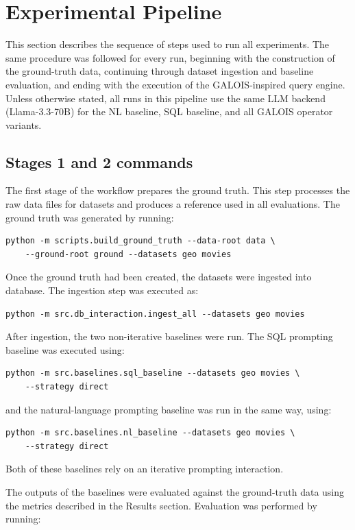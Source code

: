 \documentclass[11pt]{article}
\begin{document}
\clearpage
\section{Experimental Pipeline}
This section describes the sequence of steps used to run all experiments. The same procedure was followed for every run, beginning with the construction of the ground-truth data, continuing through dataset ingestion and baseline evaluation, and ending with the execution of the GALOIS-inspired query engine.
Unless otherwise stated, all runs in this pipeline use the same LLM backend (Llama-3.3-70B) for the NL baseline, SQL baseline, and all GALOIS operator variants.
\subsection{Stages 1 and 2 commands}
The first stage of the workflow prepares the ground truth. This step processes the raw data files for datasets and produces a reference used in all evaluations. The ground truth was generated by running:

\begin{verbatim}
python -m scripts.build_ground_truth --data-root data \
    --ground-root ground --datasets geo movies
\end{verbatim}

Once the ground truth had been created, the datasets were ingested into database. The ingestion step was executed as:

\begin{verbatim}
python -m src.db_interaction.ingest_all --datasets geo movies
\end{verbatim}

After ingestion, the two non-iterative baselines were run. The SQL prompting baseline was executed using:

\begin{verbatim}
python -m src.baselines.sql_baseline --datasets geo movies \
    --strategy direct
\end{verbatim}

and the natural-language prompting baseline was run in the same way, using:

\begin{verbatim}
python -m src.baselines.nl_baseline --datasets geo movies \
    --strategy direct
\end{verbatim}

Both of these baselines rely on an iterative prompting interaction. 

The outputs of the baselines were evaluated against the ground-truth data using the metrics described in the Results section. Evaluation was performed by running:
\end{document}
